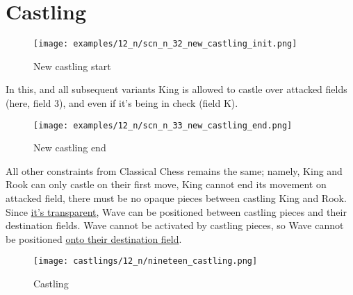\section*{Castling}
\label{sec:Nineteen/Castling}

\vspace*{-1.7\baselineskip}
\noindent
\begin{figure}[!h]
\texttt{[image: examples/12\_n/scn\_n\_32\_new\_castling\_init.png]}
\vspace*{-1.4\baselineskip}
\caption{New castling start}
\label{fig:scn_n_32_new_castling_init}
\end{figure}

\vspace*{-0.7\baselineskip}
In this, and all subsequent variants King is allowed to castle over attacked fields
(here, field 3), and even if it's being in check (field K).

\vspace*{-0.7\baselineskip}
\noindent
\begin{figure}[!h]
\texttt{[image: examples/12\_n/scn\_n\_33\_new\_castling\_end.png]}
\vspace*{-1.4\baselineskip}
\caption{New castling end}
\label{fig:scn_n_33_new_castling_end}
\end{figure}

\vspace*{-0.7\baselineskip}
All other constraints from Classical Chess remains the same; namely, King and Rook
can only castle on their first move, King cannot end its movement on attacked field,
there must be no opaque pieces between castling King and Rook. %
Since \hyperref[fig:scn_mv_07_wave_is_transparent]{it's transparent}, Wave can be
positioned between castling pieces and their destination fields.
Wave cannot be activated by castling pieces, so Wave cannot be positioned
\hyperref[fig:scn_mv_11_wave_block_castling_rook]{onto their destination field}.

\vspace*{-0.7\baselineskip}
\noindent
\begin{figure}[!h]
\texttt{[image: castlings/12\_n/nineteen\_castling.png]}
\vspace*{-1.4\baselineskip}
\caption{Castling}
\label{fig:nineteen_castling}
\end{figure}

